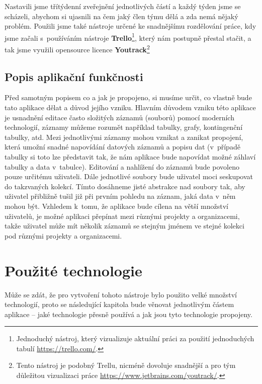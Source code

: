 \par Nastavili jsme třítýdenní zveřejnění jednotlivých částí a každý týden jsme se scházeli, abychom si ujasnili na čem jaký člen týmu dělá a zda nemá nějaký problém. Použili jsme také nástroje určené ke snadnějšímu rozdělování práce, kdy jsme začali s~používáním nástroje \textbf{Trello}\footnote{Jednoduchý nástroj, který vizualizuje aktuální práci za použití jednoduchých tabulí \url{https://trello.com/}.}, který nám postupně přestal stačit, a tak jsme využili opensource licence \textbf{Youtrack}\footnote{Tento nástroj je podobný Trellu, nicméně dovoluje snadnější a pro tým důležitou vizualizaci práce \url{https://www.jetbrains.com/youtrack/}.}

\subsection{Popis aplikační funkčnosti}
\par Před samotným popisem co a jak je propojeno, si musíme určit, co vlastně bude tato aplikace dělat a důvod jejího vzniku. Hlavním důvodem vzniku této aplikace je usnadnění editace často složitých záznamů (souborů) pomocí moderních technologií, záznamy můžeme rozumět například tabulky, grafy, kontingenční tabulky, atd. Mezi jednotlivými záznamy mohou vznikat a zanikat propojení, která umožní snadné napovídání datových záznamů a popisu dat (v~případě tabulky si toto lze představit tak, že nám aplikace bude napovídat možné záhlaví tabulky a data v~tabulce). Editování a nahlížení do záznamů bude povoleno pouze určitému uživateli. Dále jednotlivé soubory bude uživatel moci seskupovat do takzvaných kolekcí. Tímto dosáhneme jisté abstrakce nad soubory tak, aby uživatel přibližně tušil již při prvním pohledu na záznam, jaká data v~něm mohou být. Vzhledem k~tomu, že aplikace bude cílena na větší množství uživatelů, je možné aplikaci přepínat mezi různými projekty a organizacemi, takže uživatel může mít několik záznamů se stejným jménem ve stejné kolekci pod různými projekty a organizacemi.

\section{Použité technologie}
\par Může se zdát, že pro vytvoření tohoto nástroje bylo použito velké množství technologií, proto se následující kapitola bude věnovat jednotlivým částem aplikace -- jaké technologie přesně používá a jak jsou tyto technologie propojeny.

